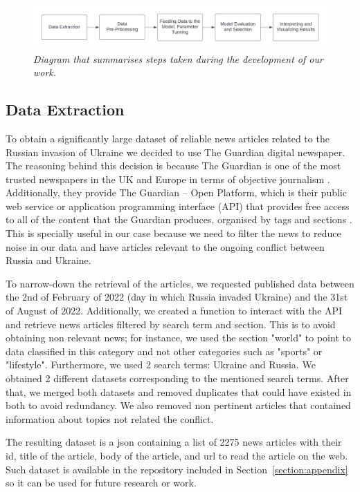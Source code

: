 \documentclass[twoside,12pt,a4paper]{article}
\begin{document}
\begin{figure}[h]
\centering
\includegraphics[scale=0.6]{method_1.png}
\caption{\textit{Diagram that summarises steps taken during the development of our work.}}
\label{fig:method_1}
\end{figure}

\subsection{Data Extraction}
To obtain a significantly large dataset of reliable news articles related to the Russian invasion of Ukraine we decided to use The Guardian digital newspaper. The reasoning behind this decision is because The Guardian is one of the most trusted newspapers in the UK and Europe in terms of objective journalism \citep{matsa_western_2018}. Additionally, they provide The Guardian – Open Platform, which is their public web service or application programming interface (API) that provides free access to all of the content that the Guardian produces, organised by tags and sections \citep{noauthor_theguardian_nodate}. This is specially useful in our case because we need to filter the news to reduce noise in our data and have articles relevant to the ongoing conflict between Russia and Ukraine.

To narrow-down the retrieval of the articles, we requested published data between the 2nd of February of 2022 (day in which Russia invaded Ukraine) and the 31st of August of 2022. Additionally, we created a function to interact with the API and retrieve news articles filtered by search term and section. This is to avoid obtaining non relevant news; for instance, we used the section "world" to point to data classified in this category and not other categories such as "sports" or "lifestyle". Furthermore, we used 2 search terms: Ukraine and Russia. We obtained 2 different datasets corresponding to the mentioned search terms. After that, we merged both datasets and removed duplicates that could have existed in both to avoid redundancy. We also removed non pertinent articles that contained information about topics not related the conflict.

The resulting dataset is a json containing a list of 2275 news articles with their id, title of the article, body of the article, and url to read the article on the web. Such dataset is available in the repository included in Section~\ref{section:appendix} so it can be used for future research or work.
\end{document}
